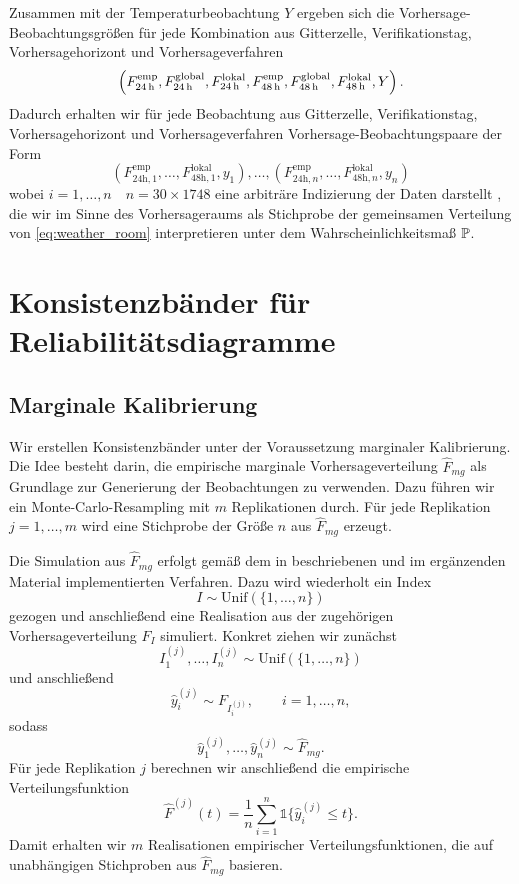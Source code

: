 Zusammen mit der Temperaturbeobachtung  $Y$ ergeben sich die Vorhersage-Beobacht\-ungs\-größen für jede Kombination aus Gitterzelle, Verifikationstag, Vorhersagehorizont und Vorhersageverfahren
\begin{equation} \label{eq:weather_room}
  \left(F^{\mathrm{emp}}_{24\,\mathrm{h}}, F^{\mathrm{global}}_{24\,\mathrm{h}},  F^{\mathrm{lokal}}_{24\,\mathrm{h}}, F^{\mathrm{emp}}_{48\,\mathrm{h}}, F^{\mathrm{global}}_{48\,\mathrm{h}},  F^{\mathrm{lokal}}_{48\,\mathrm{h}}, Y \right) .
\end{equation}
Dadurch erhalten wir für jede Beobachtung aus Gitterzelle, Verifikationstag, Vorhersagehorizont und Vorhersageverfahren Vorhersage-Beobachtungspaare der Form
\begin{equation}
    \left( F^{\mathrm{emp}}_{24\mathrm{h},1}, \dots, F^{\mathrm{lokal}}_{48\mathrm{h},1}, y_1 \right), \dots, \left( F^{\mathrm{emp}}_{24\mathrm{h},n}, \dots, F^{\mathrm{lokal}}_{48\mathrm{h},n}, y_n \right)
\end{equation}
wobei $i=1,\dotsc,n \quad n=30 \times1748$ eine arbiträre Indizierung der Daten darstellt , 
die wir im Sinne des Vorhersageraums als Stichprobe der gemeinsamen Verteilung von \eqref{eq:weather_room} interpretieren unter dem Wahrscheinlichkeitsmaß $\mathbb{P}$.


\chapter{Konsistenzbänder für Reliabilitätsdiagramme}

\section{Marginale Kalibrierung}\label{seq:consist_marg}
Wir erstellen Konsistenzbänder unter der Voraussetzung marginaler Kalibrierung. Die Idee besteht darin, die empirische marginale Vorhersageverteilung $\hat{F}_{mg}$ als Grundlage zur Generierung der Beobachtungen zu verwenden. Dazu führen wir ein Monte-Carlo-Resampling mit $m$ Replikationen durch. Für jede Replikation $j = 1, \dots, m$ wird eine Stichprobe der Größe $n$ aus $\hat{F}_{mg}$ erzeugt.

Die Simulation aus $\hat{F}_{mg}$ erfolgt gemäß dem in \textcite{gneiting2023regression} beschriebenen und im ergänzenden Material \parencite{gneiting2023supp} implementierten Verfahren. Dazu wird wiederholt ein Index
\[
I \sim \mathrm{Unif}(\{1,\dots,n\})
\]
gezogen und anschließend eine Realisation aus der zugehörigen Vorhersageverteilung $F_I$ simuliert. Konkret ziehen wir zunächst
\[
I^{(j)}_1,\dots,I^{(j)}_n \sim \mathrm{Unif}(\{1,\dots,n\})
\]
und anschließend
\[
\hat y^{(j)}_i \sim F_{I^{(j)}_i},
\qquad i=1,\dots,n,
\]
sodass
\[
\hat y^{(j)}_1,\dots,\hat y^{(j)}_n \sim \hat F_{mg}.
\]
Für jede Replikation $j$ berechnen wir anschließend die empirische Verteilungsfunktion
\[
\hat{F}^{(j)}(t)
=
\frac{1}{n}
\sum_{i=1}^n
\mathds{1}\{\hat y^{(j)}_i \le t\}.
\]
Damit erhalten wir $m$ Realisationen empirischer Verteilungsfunktionen, die auf unabhängigen Stichproben aus $\hat{F}_{mg}$ basieren.

